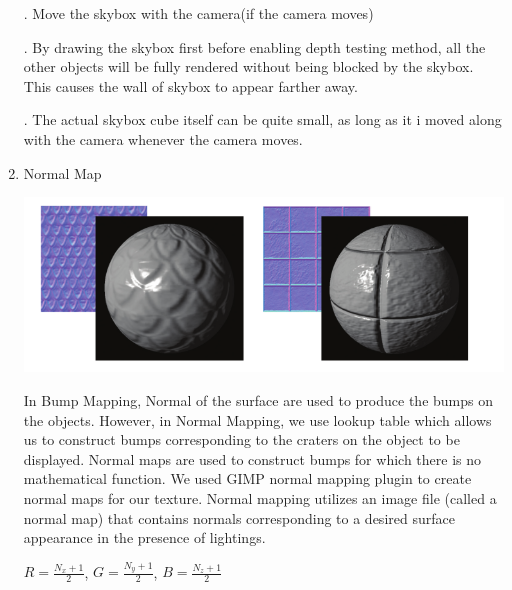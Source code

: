 \documentclass[12pt]{article}
\begin{document}
\begin{enumerate}
	. Move the skybox with the camera(if the camera moves)
	
	. By drawing the skybox first before enabling depth testing method, all the other objects will be fully rendered without being blocked by the skybox. This causes the wall of skybox to appear farther away.

	. The actual skybox cube itself can be quite small, as long as it i moved along with the camera whenever the camera moves.

	
	\item Normal Map
	
	\begin{center}
	\includegraphics[scale = 0.5]{map/1.png}
	\end{center}	
	
	In Bump Mapping, Normal of the surface are used to produce the bumps on the objects. However, in Normal Mapping, we use lookup table which allows us to construct bumps corresponding to the craters on the object to be displayed. Normal maps are used to construct bumps for which there is no mathematical function. We used GIMP normal mapping plugin to create normal maps for our texture. Normal mapping utilizes an image file (called a normal map) that contains normals corresponding to a desired surface appearance in the presence of lightings.
	
	\qquad $R = \frac{N_{x} + 1}{2}$, 
	\qquad $G = \frac{N_{y} + 1}{2}$, 
	\qquad $B = \frac{N_{z} + 1}{2}$
	
\end{enumerate}

\clearpage
\end{document}

